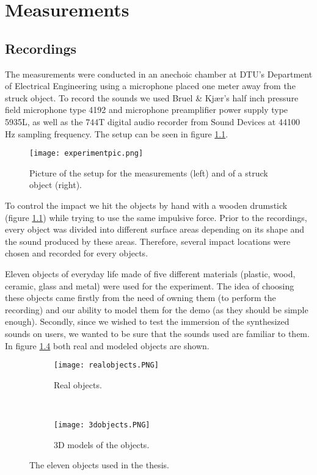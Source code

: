 \chapter{Measurements}\label{ch:measurements}

\section{Recordings}

The measurements were conducted in an anechoic chamber at DTU's Department of Electrical Engineering using a microphone placed one meter away from the struck object. To record the sounds we used Bruel \& Kjær's half inch pressure field microphone type 4192 and microphone preamplifier power supply type 5935L, as well as the 744T digital audio recorder from Sound Devices at 44100 Hz sampling frequency. The setup can be seen in figure \ref{fig:experiment}.

\begin{figure}[H]
  \centering
    \texttt{[image: experimentpic.png]}
      \caption{Picture of the setup for the measurements (left) and of a struck object (right).}\label{fig:experiment}
\end{figure}

To control the impact we hit the objects by hand with a wooden drumstick (figure \ref{fig:experiment}) while trying to use the same impulsive force. Prior to the recordings, every object was divided into different surface areas depending on its shape and the sound produced by these areas. Therefore, several impact locations were chosen and recorded for every objects.

Eleven objects of everyday life made of five different materials (plastic, wood, ceramic, glass and metal) were used for the experiment. The idea of choosing these objects came firstly from the need of owning them (to perform the recording) and our ability to model them for the demo (as they should be simple enough). Secondly, since we wished to test the immersion of the synthesized sounds on users, we wanted to be sure that the sounds used are familiar to them. In figure \ref{fig:objects} both real and modeled objects are shown. 

\begin{figure}[H]
    \centering
    \begin{subfigure}[b]{0.7\textwidth}
        \texttt{[image: realobjects.PNG]}
        \caption{Real objects.}
        \label{fig:gull}
    \end{subfigure}
    ~ %
    \begin{subfigure}[b]{0.7\textwidth}
        \texttt{[image: 3dobjects.PNG]}
        \caption{3D models of the objects.}
        \label{fig:tiger}
    \end{subfigure}
    \caption{The eleven objects used in the thesis.}\label{fig:objects}
\end{figure}


